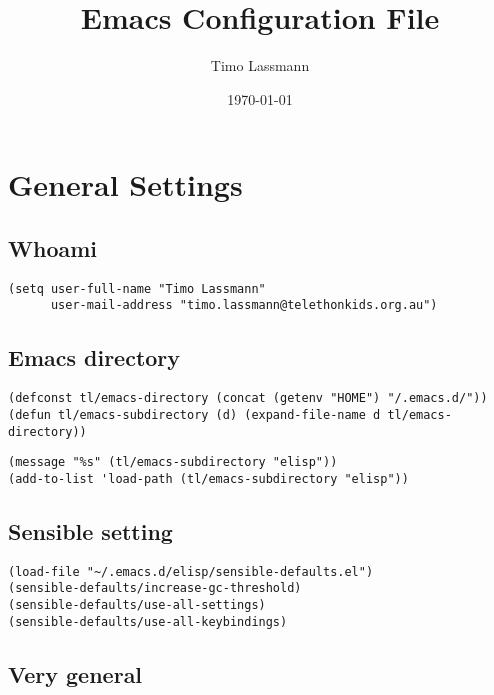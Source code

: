 \documentclass[12pt]{article}
\author{Timo Lassmann}
\date{\today}
\title{Emacs Configuration File}
\begin{document}
\maketitle
\section{General Settings}
\label{sec-1}
\subsection{Whoami}
\label{sec-1-1}

\lstset{language=Lisp,label= ,caption= ,numbers=none}
\begin{lstlisting}
(setq user-full-name "Timo Lassmann"
      user-mail-address "timo.lassmann@telethonkids.org.au")
\end{lstlisting}

\subsection{Emacs directory}
\label{sec-1-2}

\lstset{language=Lisp,label= ,caption= ,numbers=none}
\begin{lstlisting}
(defconst tl/emacs-directory (concat (getenv "HOME") "/.emacs.d/"))
(defun tl/emacs-subdirectory (d) (expand-file-name d tl/emacs-directory))
\end{lstlisting}

\lstset{language=Lisp,label= ,caption= ,numbers=none}
\begin{lstlisting}
(message "%s" (tl/emacs-subdirectory "elisp"))
(add-to-list 'load-path (tl/emacs-subdirectory "elisp"))
\end{lstlisting}

\subsection{Sensible setting}
\label{sec-1-3}

\lstset{language=Lisp,label= ,caption= ,numbers=none}
\begin{lstlisting}
(load-file "~/.emacs.d/elisp/sensible-defaults.el")
(sensible-defaults/increase-gc-threshold)
(sensible-defaults/use-all-settings)
(sensible-defaults/use-all-keybindings)
\end{lstlisting}

\subsection{Very general}
\label{sec-1-4}
\end{document}
